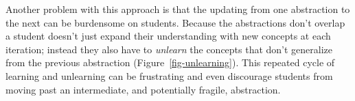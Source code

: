 \documentclass[
  letterpaper,
  DIV=11,
  numbers=noendperiod]{scrartcl}
\begin{document}
Another problem with this approach is that the updating from one
abstraction to the next can be burdensome on students. Because the
abstractions don't overlap a student doesn't just expand their
understanding with new concepts at each iteration; instead they also
have to \emph{unlearn} the concepts that don't generalize from the
previous abstraction (Figure~\ref{fig-unlearning}). This repeated cycle
of learning and unlearning can be frustrating and even discourage
students from moving past an intermediate, and potentially fragile,
abstraction.

\begin{figure}

\begin{minipage}[t]{0.33\linewidth}

{\centering 

~

}

\end{minipage}%
%
\begin{minipage}[t]{0.33\linewidth}

{\centering 


}

\subcaption{\label{fig-unlearning1}}
\end{minipage}%
%
\begin{minipage}[t]{0.33\linewidth}

{\centering 

~

}
\end{minipage}
\end{figure}
\end{document}

